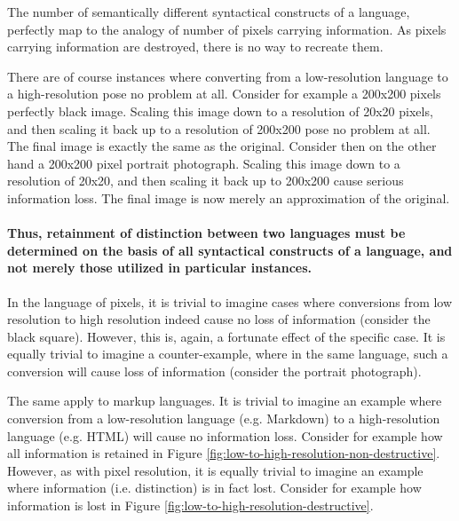 \documentclass{scrreprt}
\begin{document}
The number of semantically different syntactical constructs of a language, perfectly map to the analogy of number of pixels carrying information. As pixels carrying information are destroyed, there is no way to recreate them.

There are of course instances where converting from a low-resolution language to a high-resolution pose no problem at all. Consider for example a 200x200 pixels perfectly black image. Scaling this image down to a resolution of 20x20 pixels, and then scaling it back up to a resolution of 200x200 pose no problem at all. The final image is exactly the same as the original. Consider then on the other hand a 200x200 pixel portrait photograph. Scaling this image down to a resolution of 20x20, and then scaling it back up to 200x200 cause serious information loss. The final image is now merely an approximation of the original.


\paragraph{Thus, retainment of distinction between two languages must be determined on the basis of all syntactical constructs of a language, and not merely those utilized in particular instances.}
In the language of pixels, it is trivial to imagine cases where conversions from low resolution to high resolution indeed cause no loss of information (consider the black square). However, this is, again, a fortunate effect of the specific case. It is equally trivial to imagine a counter-example, where in the same language, such a conversion will cause loss of information (consider the portrait photograph).

The same apply to markup languages. It is trivial to imagine an example where conversion from a low-resolution language (e.g. Markdown) to a high-resolution language (e.g. HTML) will cause no information loss. Consider for example how all information is retained in Figure \ref{fig:low-to-high-resolution-non-destructive}. However, as with pixel resolution, it is equally trivial to imagine an example where information (i.e. distinction) is in fact lost. Consider for example how information is lost in Figure \ref{fig:low-to-high-resolution-destructive}.
\end{document}
